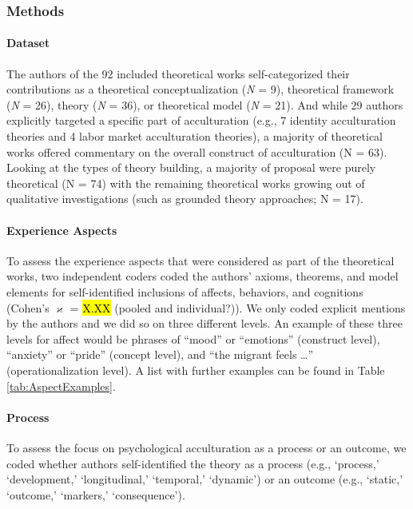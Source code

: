 

\subsubsection{Methods}
\paragraph{Dataset}

The authors of the 92 included theoretical works self-categorized their
contributions as a theoretical conceptualization (\textit{N} = 9),
theoretical framework (\textit{N} = 26), theory (\textit{N} = 36), or
theoretical model (\textit{N} = 21). And while 29 authors explicitly
targeted a specific part of acculturation (e.g., 7 identity
acculturation theories and 4 labor market acculturation theories), a
majority of theoretical works offered commentary on the overall
construct of acculturation (N = 63). Looking at the types of theory
building, a majority of proposal were purely theoretical (N = 74) with
the remaining theoretical works growing out of qualitative
investigations (such as grounded theory approaches; N = 17).

\paragraph{Experience Aspects}

To assess the experience aspects that were considered as part of the
theoretical works, two independent coders coded the authors' axioms,
theorems, and model elements for self-identified inclusions of affects,
behaviors, and cognitions (Cohen's \(\varkappa\) = \hl{X.XX} (pooled and
individual?)). We only coded explicit mentions by the authors and we did
so on three different levels. An example of these three levels for
affect would be phrases of ``mood'' or ``emotions'' (construct level),
``anxiety'' or ``pride'' (concept level), and ``the migrant feels
\ldots{}'' (operationalization level). A list with further examples can
be found in Table \ref{tab:AspectExamples}.

\paragraph{Process}

To assess the focus on psychological acculturation as a process or an
outcome, we coded whether authors self-identified the theory as a
process (e.g., `process,' `development,' `longitudinal,' `temporal,'
`dynamic') or an outcome (e.g., `static,' `outcome,' `markers,'
`consequence').

